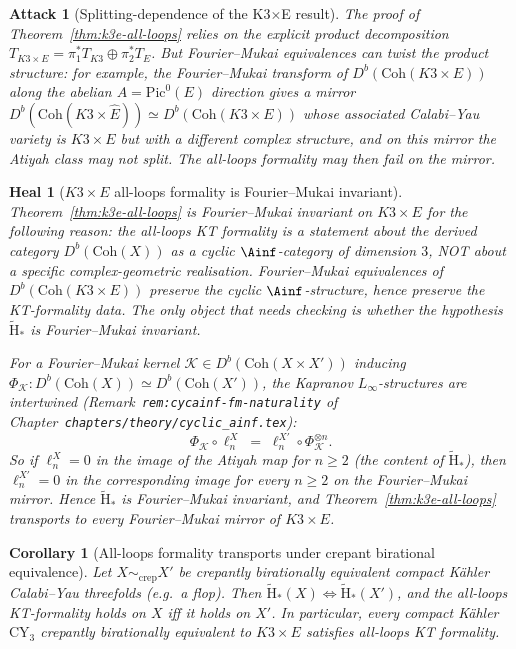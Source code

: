 \documentclass[11pt]{article}
\newtheorem{corollary}[theorem]{Corollary}
\newtheorem{attack}[theorem]{Attack}
\newtheorem{heal}[theorem]{Heal}
\providecommand{\CY}{\mathrm{CY}}
\providecommand{\Coh}{\mathrm{Coh}}
\begin{document}
\begin{attack}[Splitting-dependence of the K3$\times$E result]
\label{att:splitting-dependence}
The proof of Theorem~\ref{thm:k3e-all-loops} relies on the explicit
product decomposition $T_{K3\times E} = \pi_1^* T_{K3} \oplus
\pi_2^* T_E$.  But Fourier--Mukai equivalences can twist the
product structure:  for example, the Fourier--Mukai transform of
$D^b(\Coh(K3 \times E))$ along the abelian $A = \mathrm{Pic}^0(E)$
direction gives a mirror $D^b(\Coh(K3 \times \hat E)) \simeq
D^b(\Coh(K3 \times E))$ whose associated Calabi--Yau variety is
$K3 \times E$ but with a different complex structure, and on this
mirror the Atiyah class may not split.  The all-loops formality
may then fail on the mirror.
\end{attack}

\begin{heal}[$K3 \times E$ all-loops formality is Fourier--Mukai
invariant]
\label{heal:fm-invariant}
Theorem~\ref{thm:k3e-all-loops} is Fourier--Mukai invariant on
$K3 \times E$ for the following reason: the all-loops KT formality
is a statement about the derived category $D^b(\Coh(X))$ as a
cyclic $\Ainf$-category of dimension $3$, NOT about a specific
complex-geometric realisation.  Fourier--Mukai equivalences of
$D^b(\Coh(K3 \times E))$ preserve the cyclic $\Ainf$-structure,
hence preserve the KT-formality data.  The only object that
needs checking is whether the hypothesis $\widetilde{\mathrm{H}}_*$
is Fourier--Mukai invariant.

For a Fourier--Mukai kernel $\mathcal K \in D^b(\Coh(X \times X'))$
inducing $\Phi_{\mathcal K}: D^b(\Coh(X)) \simeq D^b(\Coh(X'))$,
the Kapranov $L_\infty$-structures are intertwined
(Remark~\texttt{rem:cycainf-fm-naturality} of
Chapter~\texttt{chapters/theory/cyclic\_ainf.tex}):
\[
  \Phi_{\mathcal K} \circ \ell_n^X \;=\; \ell_n^{X'} \circ
    \Phi_{\mathcal K}^{\otimes n}.
\]
So if $\ell_n^X = 0$ in the image of the Atiyah map for $n \geq 2$
(the content of $\widetilde{\mathrm H}_*$), then $\ell_n^{X'} = 0$
in the corresponding image for every $n \geq 2$ on the
Fourier--Mukai mirror.  Hence
$\widetilde{\mathrm{H}}_*$ is Fourier--Mukai invariant, and
Theorem~\ref{thm:k3e-all-loops} transports to every Fourier--Mukai
mirror of $K3 \times E$.
\end{heal}

\begin{corollary}[All-loops formality transports under crepant
birational equivalence]
\label{cor:crepant-birational}
\ClaimStatusTheorem
Let $X \sim_{\mathrm{crep}} X'$ be crepantly birationally equivalent
compact K\"ahler Calabi--Yau threefolds (e.g.\ a flop).  Then
$\widetilde{\mathrm{H}}_*(X) \iff \widetilde{\mathrm{H}}_*(X')$, and
the all-loops KT-formality holds on $X$ iff it holds on $X'$.  In
particular, every compact K\"ahler $\CY_3$ crepantly birationally
equivalent to $K3 \times E$ satisfies all-loops KT formality.
\end{corollary}
\end{document}
